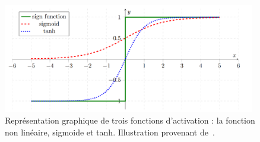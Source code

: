 \begin{figure}
  \centering
  \includegraphics[width=11cm]{./Chapitre2/figures/activation.png}
  \caption{Représentation graphique de trois fonctions d'activation : la fonction non linéaire, sigmoide et tanh. Illustration provenant de~\cite{Thoma2014}.}
  \label{fig:activation}
\end{figure}
